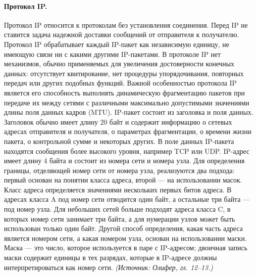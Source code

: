 \documentclass[a4paper,12pt]{article}
\begin{document}
\paragraph{Протокол IP.}
Протокол IP относится к протоколам без установления соединения. Перед IP не ставится задача надежной доставки сообщений от отправителя к получателю. Протокол IP обрабатывает каждый IP-пакет как независимую единицу, не имеющую связи ни с какими другими IP-пакетами. В протоколе IP нет механизмов, обычно применяемых для увеличения достоверности конечных данных: отсутствует квитирование, нет процедуры упорядочивания, повторных передач или других подобных функций. Важной особенностью протокола IP является его способность выполнять динамическую фрагментацию пакетов при передаче их между сетями с различными максимально допустимыми значениями длины поля данных кадров (MTU). IP-пакет состоит из заголовка и поля данных. Заголовок обычно имеет длину 20 байт и содержит информацию о сетевых адресах отправителя и получателя, о параметрах фрагментации, о времени жизни пакета, о контрольной сумме и некоторых других. В поле данных IP-пакета находятся сообщения более высокого уровня, например TCP или UDP. IP-адрес имеет длину 4 байта и состоит из номера сети и номера узла. Для определения границы, отделяющей номер сети от номера узла, реализуются два подхода: первый основан на понятии класса адреса, второй — на использовании масок. Класс адреса определяется значениями нескольких первых битов адреса. В адресах класса A под номер сети отводится один байт, а остальные три байта — под номер узла. Для небольших сетей больше подходят адреса класса C, в которых номер сети занимает три байта, а для нумерации узлов может быть использован только один байт. Другой способ определения, какая часть адреса является номером сети, а какая номером узла, основан на использовании маски. Маска — это число, которое используется в паре с IP-адресом; двоичная запись маски содержит единицы в тех разрядах, которые в IP-адресе должны интерпретироваться как номер сети.
\textit{(Источник: Олифер, гл. 12–13.)}
\end{document}
